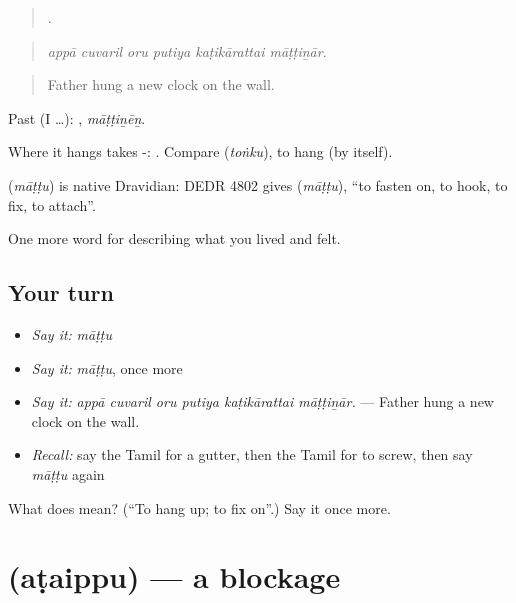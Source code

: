 \begin{quote}
     .
\end{quote}

\begin{quote}
\emph{appā cuvaril oru putiya kaṭikārattai māṭṭiṉār.}
\end{quote}

\begin{quote}
Father hung a new clock on the wall.
\end{quote}

Past (I …): , \emph{māṭṭiṉēṉ}.

Where it hangs takes -:  . Compare  (\emph{toṅku}), to hang (by itself).

\begin{cousinweb}
\textbf{} (\emph{māṭṭu}) is native Dravidian: DEDR 4802 gives  (\emph{māṭṭu}), \textquotedblleft{}to fasten on, to hook, to fix, to attach\textquotedblright{}.
\end{cousinweb}

\begin{grammarlens}[title={What you've built}]
One more word for describing what you lived and felt.
\end{grammarlens}

\subsection*{Your turn}
\begin{itemize}
\raggedright
  \item \emph{Say it:} \emph{māṭṭu}
  \item \emph{Say it:} \emph{māṭṭu}, once more
  \item \emph{Say it:} \emph{appā cuvaril oru putiya kaṭikārattai māṭṭiṉār.} — Father hung a new clock on the wall.
  \item \emph{Recall:} say the Tamil for a gutter, then the Tamil for to screw, then say \emph{māṭṭu} again
\end{itemize}

\begin{tcolorbox}[breakable,colback=teal!4,colframe=teal!35!black,title={Before you move on}]
What does  mean? (\textquotedblleft{}To hang up; to fix on\textquotedblright{}.) Say it once more.
\end{tcolorbox}
\section[\texorpdfstring{\ta{அடைப்பு} (aṭaippu)}{அடைப்பு (aṭaippu)}]{ (aṭaippu) — a blockage}

